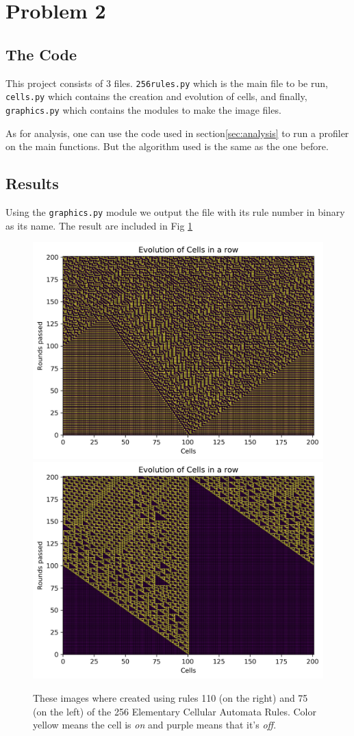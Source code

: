\documentclass[12pt]{article}
\begin{document}
	\section{Problem 2}
	\subsection{The Code}
	This project consists of 3 files. \texttt{256rules.py} which is the main file to be run,
	\texttt{cells.py} which contains the creation and evolution of cells, and finally, \texttt{graphics.py} which contains the modules to make the image files.
	
	As for analysis, one can use the code used in section\ref{sec:analysis} to run a profiler on the main functions. But the algorithm used is the same as the one before.
	
	\subsection{Results}
	Using the \texttt{graphics.py} module we output the file with its rule number in binary as its name. The result are included in Fig \ref{fig:2rules}
	\begin{figure}[h!]
		\includegraphics[width=0.45\linewidth]{../P2/Hats01001011.jpg}
		\includegraphics[width=0.45\linewidth]{../P2/Hats01101110.jpg}
		\label{fig:2rules}
		\caption{These images where created using rules 110 (on the right) and 75 (on the left)
							 of the 256 Elementary Cellular Automata Rules. Color yellow means the 
							 cell is \emph{on} and purple means that it's \emph{off}. }
	\end{figure}
	
\end{document}
